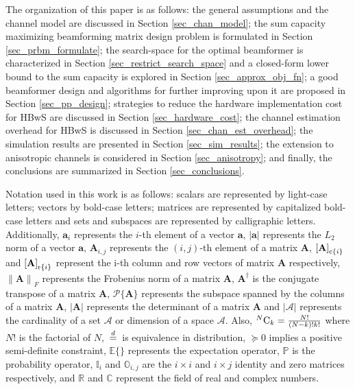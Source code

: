\documentclass[journal,comsoc]{IEEEtran}
\begin{document}
The organization of this paper is as follows: the general assumptions and the channel model are discussed in Section \ref{sec_chan_model}; the  sum capacity maximizing beamforming matrix design problem is formulated in Section \ref{sec_prbm_formulate}; the search-space for the optimal beamformer is characterized in Section \ref{sec_restrict_search_space} and a closed-form lower bound to the sum capacity is explored in Section \ref{sec_approx_obj_fn}; a good beamformer design and algorithms for further improving upon it are proposed in Section \ref{sec_pp_design}; strategies to reduce the hardware implementation cost for HBwS are discussed in Section \ref{sec_hardware_cost}; the channel estimation overhead for HBwS is discussed in Section \ref{sec_chan_est_overhead}; the simulation results are presented in Section \ref{sec_sim_results}; the extension to anisotropic channels is considered in Section \ref{sec_anisotropy}; and finally, the conclusions are summarized in Section \ref{sec_conclusions}.

Notation used in this work is as follows: scalars are represented by light-case letters; vectors by bold-case letters; matrices are represented by capitalized bold-case letters and sets and subspaces are represented by calligraphic letters. Additionally, $\mathbf{a}_i$ represents the $i$-th element of a vector $\mathbf{a}$, $|\mathbf{a}|$ represents the $L_2$ norm of a vector $\mathbf{a}$, $\mathbf{A}_{i,j}$ represents the $(i,j)$-th element of a matrix $\mathbf{A}$, ${[\mathbf{A}]}_{{\rm c}\{i\}}$ and ${[\mathbf{A}]}_{{\rm r}\{i\}}$ represent the i-th column and row vectors of matrix $\mathbf{A}$ respectively, ${\|\mathbf{A}\|}_F$ represents the Frobenius norm of a matrix $\mathbf{A}$, $\mathbf{A}^{\dag}$ is the conjugate transpose of a matrix $\mathbf{A}$, $\mathcal{P}\{\mathbf{A}\}$ represents the subspace spanned by the columns of a matrix $\mathbf{A}$, $|\mathbf{A}|$ represents the determinant of a matrix $\mathbf{A}$ and $|\mathcal{A}|$ represents the cardinality of a set $\mathcal{A}$ or dimension of a space $\mathcal{A}$. Also, ${}^N {\rm C}_k = \frac{N!}{(N-k)! k!}$ where $N!$ is the factorial of $N$, $\,{\buildrel d \over =}\,$ is equivalence in distribution, $\succeq 0$ implies a positive semi-definite constraint, $\mathbb{E}\{\}$ represents the expectation operator, $\mathbb{P}$ is the probability operator, $\mathbb{I}_i$ and $\mathbb{O}_{i,j}$ are the $i \times i$ and $i \times j$ identity and zero matrices respectively, and $\mathbb{R}$ and $\mathbb{C}$ represent the field of real and complex numbers.
\end{document}
